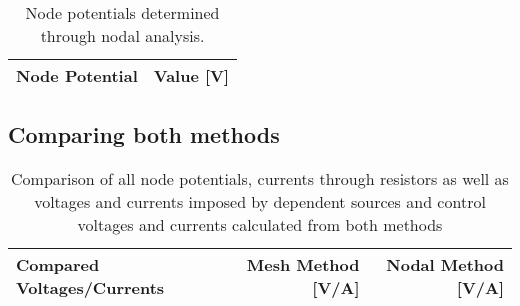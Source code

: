 \begin{table}[hbt!]
  \centering
  \begin{tabular}{|c|c|}
    \hline    
    {\bf Node Potential} & {\bf Value [V]} \\ \hline
    
  \end{tabular}
  \caption{Node potentials determined through nodal analysis.}
  \label{tab:node}
\end{table}


\newpage
\subsection{Comparing both methods}
\label{sec:comparison}
\par


\begin{table}[hbtp!]
  \centering
  \begin{tabular}{|l|r|r|}
    \hline    
    {\bf Compared Voltages/Currents} & {\bf Mesh Method [V/A]} & {\bf Nodal Method [V/A]} \\ \hline
    
  \end{tabular}
  \caption{Comparison of all node potentials, currents through resistors as well as voltages and currents imposed by dependent sources and control voltages and currents calculated from both methods}
  \label{tab:comp}
\end{table}

